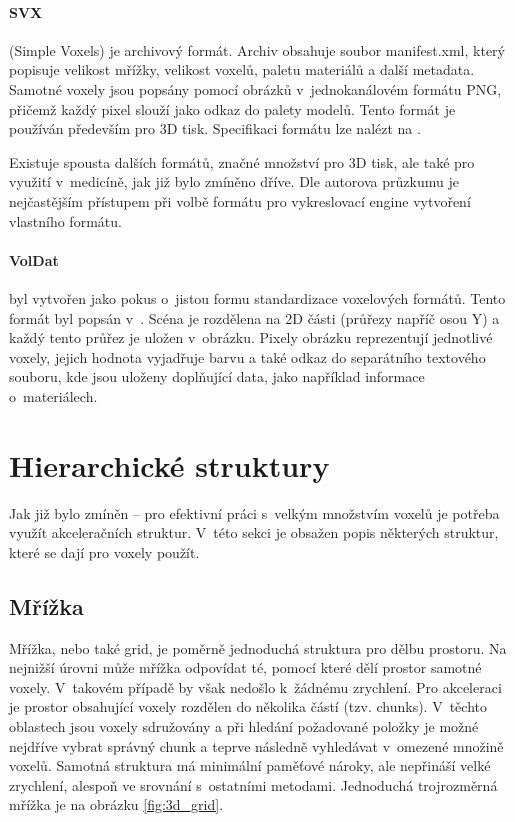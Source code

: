 \paragraph{SVX} (Simple Voxels) je archivový formát. Archiv obsahuje soubor manifest.xml, který popisuje velikost mřížky, velikost voxelů, paletu materiálů a další metadata. Samotné voxely jsou popsány pomocí obrázků v~jednokanálovém formátu PNG, přičemž každý pixel slouží jako odkaz do palety modelů. Tento formát je používán především pro 3D tisk. Specifikaci formátu lze nalézt na \cite{svx_format_2014}.

Existuje spousta dalších formátů, značné množství pro 3D tisk, ale také pro využití v~medicíně, jak již bylo zmíněno dříve. Dle autorova průzkumu je nejčastějším přístupem při volbě formátu pro vykreslovací engine vytvoření vlastního formátu.

\paragraph{VolDat} byl vytvořen jako pokus o~jistou formu standardizace voxelových formátů. Tento formát byl popsán v~\cite{williams_2013}. Scéna je rozdělena na 2D části (průřezy napříč osou Y) a každý tento průřez je uložen v~obrázku. Pixely obrázku reprezentují jednotlivé voxely, jejich hodnota vyjadřuje barvu a také odkaz do separátního textového souboru, kde jsou uloženy doplňující data, jako například informace o~materiálech. 


\section{Hierarchické struktury}
Jak již bylo zmíněn -- pro efektivní práci s~velkým množstvím voxelů je potřeba využít akceleračních struktur. V~této sekci je obsažen popis některých struktur, které se dají pro voxely použít.

\subsection{Mřížka}
Mřížka, nebo také grid, je poměrně jednoduchá struktura pro dělbu prostoru. Na nejnižší úrovni může mřížka odpovídat té, pomocí které dělí prostor samotné voxely. V~takovém případě by však nedošlo k~žádnému zrychlení. Pro akceleraci je prostor obsahující voxely rozdělen do několika částí (tzv. chunks). V~těchto oblastech jsou voxely sdružovány a při hledání požadované položky je možné nejdříve vybrat správný chunk a teprve následně vyhledávat v~omezené množině voxelů. Samotná struktura má minimální paměťové nároky, ale nepřináší velké zrychlení, alespoň ve srovnání s~ostatními metodami. Jednoduchá trojrozměrná mřížka je na obrázku \ref{fig:3d_grid}.

